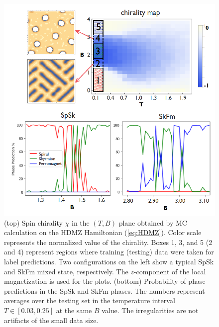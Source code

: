 \documentclass[reprint,amsmath,amssymb,aps,showpacs,superscriptaddress,prl]{revtex4-1}
\begin{document}
\begin{figure}[h]
\includegraphics[scale=0.5]{fig2.png}
\caption{(top) Spin chirality $\chi$ in the $(T,B)$ plane obtained by MC calculation on the HDMZ Hamiltonian (\ref{eq:HDMZ}). Color scale represents the normalized value of the chirality. Boxes 1, 3, and 5 (2 and 4) represent regions where training (testing) data were taken for label predictions. Two configurations on the left show a typical SpSk and SkFm mixed state, respectively. The $z$-component of the local magnetization is used for the plots. (bottom) Probability of phase predictions in the SpSk and SkFm phases. The numbers represent averages over the testing set in the temperature interval $T\in[0.03,0.25]$ at the same $B$ value. The irregularities are not artifacts of the small data size.}\label{fig:2}
\end{figure}
\end{document}
